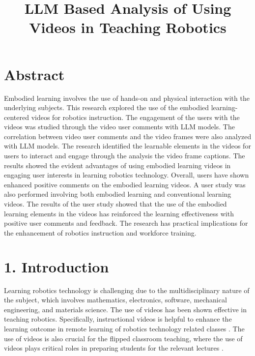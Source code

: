 \documentclass[12pt]{article}
\title{\large \textbf{LLM Based Analysis of Using Videos in Teaching Robotics}} %
\date{} %
\begin{document}
\raggedright
\maketitle
\thispagestyle{empty}
\pagestyle{empty}

\section*{Abstract}

Embodied learning involves the use of hands-on and physical interaction with the underlying subjects. This research explored the use of the embodied learning-centered videos for robotics instruction. The engagement of the users with the videos was studied through the video user comments with LLM models. The correlation between video user comments and the video frames were also analyzed with LLM models. The research identified the learnable elements in the videos for users to interact and engage through the analysis the video frame captions. The results showed the evident advantages of using embodied learning videos in engaging user interests in learning robotics technology. Overall, users have shown enhanced positive comments on the embodied learning videos. A user study was also performed involving both embodied learning and conventional learning videos. The results of the user study showed that the use of the embodied learning elements in the videos has reinforced the learning effectiveness with positive user comments and feedback. The research has practical implications for the enhancement of robotics instruction and workforce training.           


\section*{1. Introduction}

\noindent 
Learning robotics technology is challenging due to the multidisciplinary nature of the subject, which involves mathematics, electronics, software, mechanical engineering, and materials science. The use of videos has been shown effective in teaching robotics. Specifically, instructional videos is helpful to enhance the learning outcome in remote learning of robotics technology related classes \cite{eguchi2014robotics,berry2017robotics}. The use of videos is also crucial for the flipped classroom teaching, where the use of videos plays critical roles in preparing students for the relevant lectures \cite{perez2014flipped}.    
\end{document}
